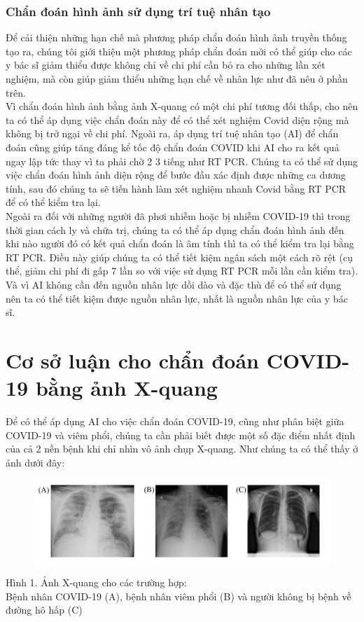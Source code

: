 \documentclass{article}
\begin{document}
\subsubsection{Chẩn đoán hình ảnh sử dụng trí tuệ nhân tạo}
Để cải thiện những hạn chế mà phương pháp chẩn đoán hình ảnh truyền thống tạo ra, chúng tôi giới thiệu một phương pháp chẩn đoán mới có thể giúp cho các y bác sĩ giảm thiểu được không chỉ về chi phí cần bỏ ra cho những lần xét nghiệm, mà còn giúp giảm thiểu những hạn chế về nhân lực như đã nêu ở phần trên.\\

Vì chẩn đoán hình ảnh bằng ảnh X-quang có một chi phí tương đối thấp, cho nên ta có thể áp dụng việc chẩn đoán này để có thể xét nghiệm Covid diện rộng mà không bị trở ngại về chi phí. Ngoài ra, áp dụng trí tuệ nhân tạo (AI) để chẩn đoán cũng giúp tăng đáng kể tốc độ chẩn đoán COVID khi AI cho ra kết quả ngay lập tức thay vì ta phải chờ 2 3 tiếng như RT PCR. Chúng ta có thể sử dụng việc chẩn đoán hình ảnh diện rộng để bước đầu xác định được những ca dương tính, sau đó chúng ta sẽ tiến hành làm xét nghiệm nhanh Covid bằng RT PCR để có thể kiểm tra lại. \\

Ngoài ra đối với những người đã phơi nhiễm hoặc bị nhiễm COVID-19 thì trong thời gian cách ly và chữa trị, chúng ta có thể áp dụng chẩn đoán hình ảnh đến khi nào người đó có kết quả chẩn đoán là âm tính thì ta có thể kiểm tra lại bằng RT PCR. Điều này giúp chúng ta có thể tiết kiệm ngân sách một cách rõ rệt (cụ thể, giảm chi phí đi gấp 7 lần so với việc sử dụng RT PCR mỗi lần cần kiểm tra). \\

Và vì AI không cần đến nguồn nhân lực dồi dào và đặc thù để có thể sử dụng nên ta có thể tiết kiệm được nguồn nhân lực, nhất là nguồn nhân lực của y bác sĩ.

\section{Cơ sở luận cho chẩn đoán COVID-19 bằng ảnh X-quang}
Để có thể áp dụng AI cho việc chẩn đoán COVID-19, cũng như phân biệt giữa COVID-19 và viêm phổi, chúng ta cần phải biết được một số đặc điểm nhất định của cả 2 nền bệnh khi chỉ nhìn vô ảnh chụp X-quang. Như chúng ta có thể thấy ở ảnh dưới đây:
\newpage
\begin{figure}[h!]
  \centering
    \includegraphics[width=\textwidth]{covid+pneumonia+normal.png}
\end{figure}
\begin{center}
    Hình 1. Ảnh X-quang cho các trường hợp:\\ Bệnh nhân COVID-19 (A), bệnh nhân viêm phổi (B) và người không bị bệnh về đường hô hấp (C)
\end{center}
\end{document}
